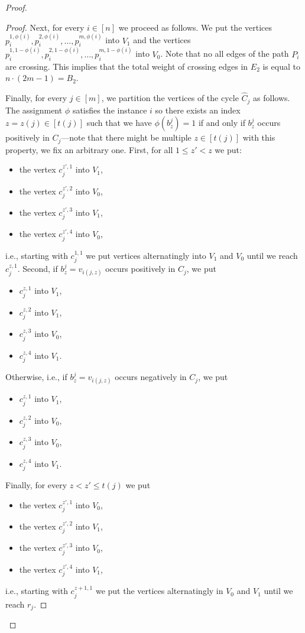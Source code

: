 \documentclass[a4paper,UKenglish,cleveref, autoref, thm-restate]{lipics-v2021}
\begin{document}
\begin{proof}
\begin{proof}
        Next, for every $i \in [n]$ we proceed as follows.
        We put the vertices $p_i^{1, \phi(i)}, p_i^{2, \phi(i)}, \dots, p_i^{m, \phi(i)}$ into $V_1$ and the vertices $p_i^{1, 1-\phi(i)}, p_i^{2, 1-\phi(i)}, \dots, p_i^{m, 1-\phi(i)}$ into $V_0$.
        Note that no all edges of the path $P_i$ are crossing.
        This implies that the total weight of crossing edges in $E_2$ is equal to $n \cdot (2m-1) = B_2$.

        Finally, for every $j \in [m]$, we partition the vertices of the cycle $\hat C_j$ as follows.
        The assignment $\phi$ satisfies the instance $i$ so there exists an index $z = z(j) \in [t(j)]$ such that we have $\phi(b^j_z) = 1$ if and only if $b^j_z$ occurs positively in $C_j$---note that there might be multiple $z \in [t(j)]$ with this property, we fix an arbitrary one.
        First, for all $1 \leq z' < z$ we put:
        \begin{itemize}
            \item the vertex $c_j^{z',1}$ into $V_1$,
            \item the vertex $c_j^{z',2}$ into $V_0$,
            \item the vertex $c_j^{z',3}$ into $V_1$,
            \item the vertex $c_j^{z',4}$ into $V_0$,
        \end{itemize}
        i.e., starting with $c_j^{1,1}$ we put vertices alternatingly into $V_1$ and $V_0$ until we reach $c_j^{z,1}$.
        Second, if $b^j_z = v_{i(j,z)}$ occurs positively in $C_j$, we put 
        \begin{itemize}
            \item $c_j^{z,1}$ into $V_1$,
            \item $c_j^{z,2}$ into $V_1$,
            \item $c_j^{z,3}$ into $V_0$,
            \item $c_j^{z,4}$ into $V_1$.
        \end{itemize}
        Otherwise, i.e., if $b^j_z = v_{i(j,z)}$ occurs negatively in $C_j$, we put 
        \begin{itemize}
            \item $c_j^{z,1}$ into $V_1$,
            \item $c_j^{z,2}$ into $V_0$,
            \item $c_j^{z,3}$ into $V_0$,
            \item $c_j^{z,4}$ into $V_1$.
        \end{itemize}
        Finally, for every $z < z' \leq t(j)$ we put 
        \begin{itemize}
            \item the vertex $c_j^{z',1}$ into $V_0$,
            \item the vertex $c_j^{z',2}$ into $V_1$,
            \item the vertex $c_j^{z',3}$ into $V_0$,
            \item the vertex $c_j^{z',4}$ into $V_1$,
        \end{itemize}
        i.e., starting with $c_j^{z+1, 1}$ we put the vertices alternatingly in $V_0$ and $V_1$ until we reach $r_j$.
        

\end{proof}
\end{proof}
\end{document}
